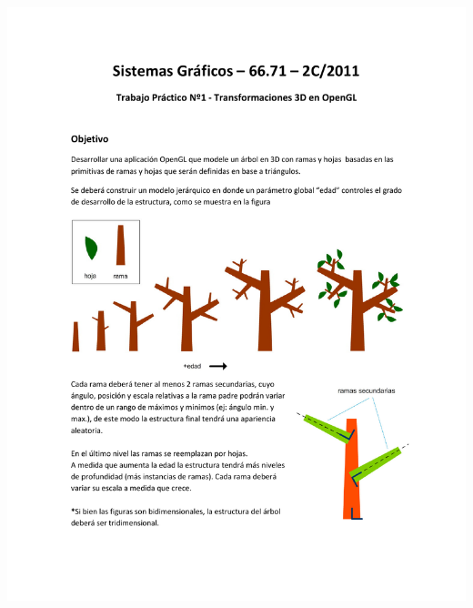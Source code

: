 \documentclass[11pt]{article}
\begin{document}
\begin{center}
\includegraphics[trim = 25mm 20mm 10mm 40mm, clip,height=0.95\textheight,width=1.04\textwidth,page={2}]{tp1-c2-2011.pdf}
\end{center}

\newpage
\end{document}
